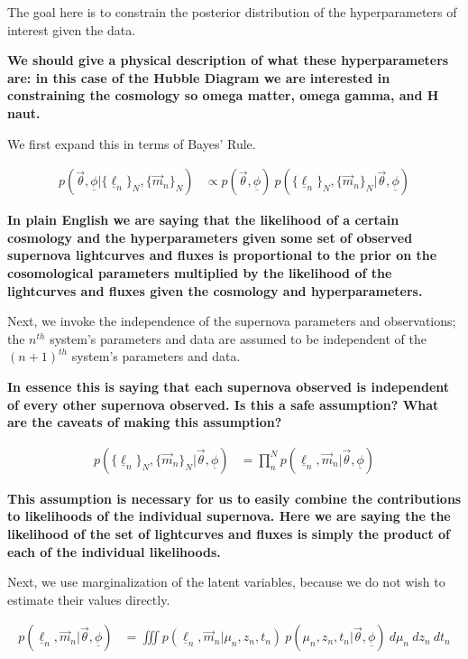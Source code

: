 \documentclass[12pt, onecolumn]{emulateapj}
\newcommand{\textul}{\underline}
\begin{document}
The goal here is to constrain the posterior distribution of the hyperparameters of interest given the data.

{\bf We should give a physical description of what these hyperparameters are: in this case of the Hubble Diagram we are interested in constraining the cosmology so omega matter, omega gamma, and H naut.}

We first expand this in terms of Bayes' Rule.

\begin{align}
p(\vec{\theta}, \textul{\phi} | \{\textul{\ell}_{n}\}_{N}, \{\vec{m}_{n}\}_{N}) &\propto p(\vec{\theta}, \textul{\phi})\ p(\{\textul{\ell}_{n}\}_{N}, \{\vec{m}_{n}\}_{N} | \vec{\theta}, \textul{\phi})
\end{align}

{\bf In plain English we are saying that the likelihood of a certain cosmology and the hyperparameters given some set of observed supernova lightcurves and fluxes is proportional to the prior on the cosomological parameters multiplied by the likelihood of the lightcurves and fluxes given the cosmology and hyperparameters.}

Next, we invoke the independence of the supernova parameters and observations; the $n^{th}$ system's parameters and data are assumed to be independent of the $(n+1)^{th}$ system's parameters and data.

{\bf In essence this is saying that each supernova observed is independent of every other supernova observed. Is this a safe assumption? What are the caveats of making this assumption?}

\begin{align}
p(\{\textul{\ell}_{n}\}_{N}, \{\vec{m}_{n}\}_{N} | \vec{\theta}, \textul{\phi}) &= \prod_{n}^{N}p(\textul{\ell}_{n}, \vec{m}_{n} | \vec{\theta}, \textul{\phi})
\end{align}

{\bf This assumption is necessary for us to easily combine the contributions to likelihoods of the individual supernova. Here we are saying the the likelihood of the set of lightcurves and fluxes is simply the product of each of the individual likelihoods.}

Next, we use marginalization of the latent variables, because we do not wish to estimate their values directly.

\begin{align}
p(\textul{\ell}_{n}, \vec{m}_{n} | \vec{\theta}, \textul{\phi}) &= \iiint p(\textul{\ell}_{n}, \vec{m}_{n} | \mu_{n}, z_{n}, t_{n})\ p(\mu_{n}, z_{n}, t_{n} | \vec{\theta}, \textul{\phi})\ d\mu_{n}\ dz_{n}\ dt_{n}
\end{align}
\end{document}
